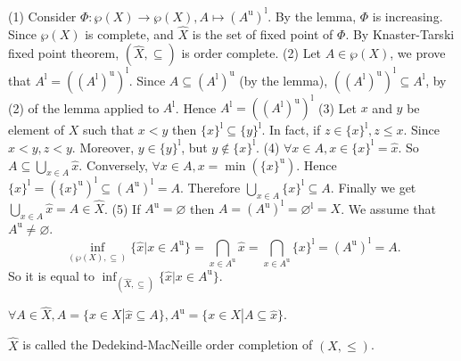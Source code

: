 \begin{proofenv}
    \quad
    \newline
    (1) Consider $\Phi :\wp(X)\rightarrow\wp(X), A\mapsto(A^\mathrm{u})^\mathrm{l}$. By the lemma,  $\Phi $  is increasing. Since $\wp(X)$ is complete, and $\hat{X}$ is the set of fixed point of $\Phi$. By Knaster-Tarski fixed point theorem, $(\hat{X}, \subseteq)$ is order complete.
    \newline
    (2) Let $A\in \wp(X)$,  we prove that $A^\mathrm{l}=((A^\mathrm{l})^\mathrm{u})^\mathrm{l}$. Since $A\subseteq (A^\mathrm{l})^\mathrm{u}$ (by the lemma),  $((A^\mathrm{l})^\mathrm{u})^\mathrm{l}\subseteq A^\mathrm{l}$,  by (2) of the lemma applied to $A^\mathrm{l}$. Hence $A^\mathrm{l}=((A^\mathrm{l})^\mathrm{u})^\mathrm{l}$
    \newline
    (3) Let $x$ and $y$ be element of $X$ such that $x< y$ then $\{x\}^\mathrm{l}\subseteq\{y\}^\mathrm{l}$. In fact,  if $z\in \{x\}^\mathrm{l}, z\le x$. Since $x<y, z<y$. Moreover,  $y\in \{y\}^\mathrm{l}$,  but $y\notin \{x\}^\mathrm{l}$.
    \newline
    (4) $\forall x \in A, x\in \{x\}^\mathrm{l}=\hat{x}$. So $A\subseteq\bigcup_{x\in A}\hat{x}$.
    Conversely,  $\forall x\in A,  x=\min (\{x\}^\mathrm{u})$. Hence $\{x\}^\mathrm{l}=(\{x\}^\mathrm{u})^\mathrm{l}\subseteq (A^\mathrm{u})^\mathrm{l}=A$. Therefore $\bigcup_{x\in A}\{x\}^\mathrm{l}\subseteq A$. Finally we get $\bigcup_{x\in A}\hat{x}=A\in \hat{X}$.
    \newline
    (5) If $A^\mathrm{u}=\varnothing$ then $A=(A^\mathrm{u})^\mathrm{l}=\varnothing^\mathrm{l}=X$. We assume that $A^\mathrm{u}\not=\varnothing$.
    $$\inf _{(\wp(X), \subseteq)}\{\hat{x}|x\in A^\mathrm{u}\}=\bigcap_{x\in A^\mathrm{u}}\hat{x}=\bigcap_{x\in A^\mathrm{u}}\{x\}^\mathrm{l}=(A^\mathrm{u})^\mathrm{l}=A.$$
    So it is equal to $\inf_{(\hat{X}, \subseteq)}\{\hat{x}|x\in A ^\mathrm{u}\}$.
\end{proofenv}
\begin{remark}
    $\forall A\in \hat{X}, A=\{x\in X|\hat{x}\subseteq A\}, A^\mathrm{u}=\{x\in X|A\subseteq \hat{x}\}$.
\end{remark}
\begin{definitionenv}
    $\hat{X}$ is called the Dedekind-MacNeille order completion of $(X, \le)$.
\end{definitionenv}
